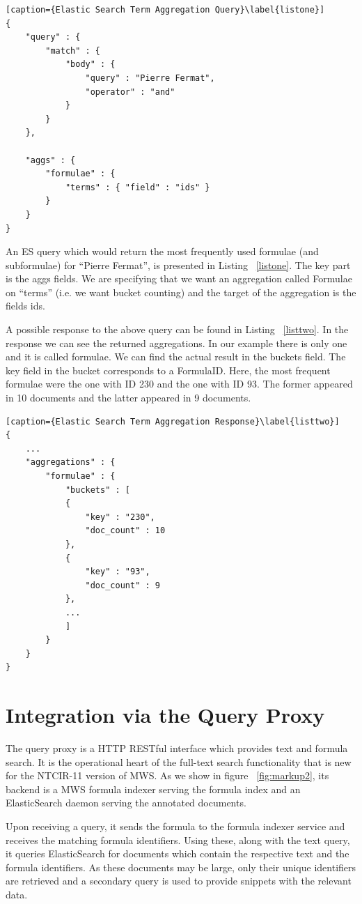 \documentclass{deliverablereport}
\begin{document}
\begin{lstlisting}[caption={Elastic Search Term Aggregation Query}\label{listone}]
{
	"query" : {
		"match" : {
			"body" : {
				"query" : "Pierre Fermat",
				"operator" : "and"
			}
		}
	},

	"aggs" : {
		"formulae" : {
			"terms" : { "field" : "ids" }
		}
	}
}

\end{lstlisting}

An ES query which would return the most frequently used formulae (and subformulae) for
“Pierre Fermat”, is presented in Listing ~\ref{listone}. The key part is the aggs fields. We are
specifying that we want an aggregation called Formulae on “terms” (i.e. we want bucket
counting) and the target of the aggregation is the fields ids. 

A possible response to the above query can be found in Listing ~\ref{listtwo}. In the response we can
see the returned aggregations. In our example there is only one and it is called
formulae. We can find the actual result in the buckets field. The key field in the bucket
corresponds to a FormulaID. Here, the most frequent formulae were the one with ID 230 and
the one with ID 93. The former appeared in 10 documents and the latter appeared in 9
documents.

\begin{lstlisting}[caption={Elastic Search Term Aggregation Response}\label{listtwo}]
{
	...
	"aggregations" : {
		"formulae" : {
			"buckets" : [
			{
				"key" : "230",
				"doc_count" : 10
			},
			{
				"key" : "93",
				"doc_count" : 9
			},
			...
			]
		}
	}
}
\end{lstlisting}

\section{Integration via the Query Proxy}\label{sec:proxy}

The query proxy is a HTTP RESTful interface which provides text and formula search. It is the operational heart of the full-text search functionality that is new for the NTCIR-11 version of MWS. As we show in figure ~\ref{fig:markup2}, its backend is a MWS formula indexer serving the formula index and an ElasticSearch daemon serving the annotated documents. 

Upon receiving a query, it sends the formula to the formula indexer service and receives the matching formula identifiers. Using these, along with the text query, it queries ElasticSearch for documents which contain the respective text and the formula identifiers. As these documents may be large, only their unique identifiers are retrieved and a secondary query is used to provide snippets with the relevant data. 
\end{document}
